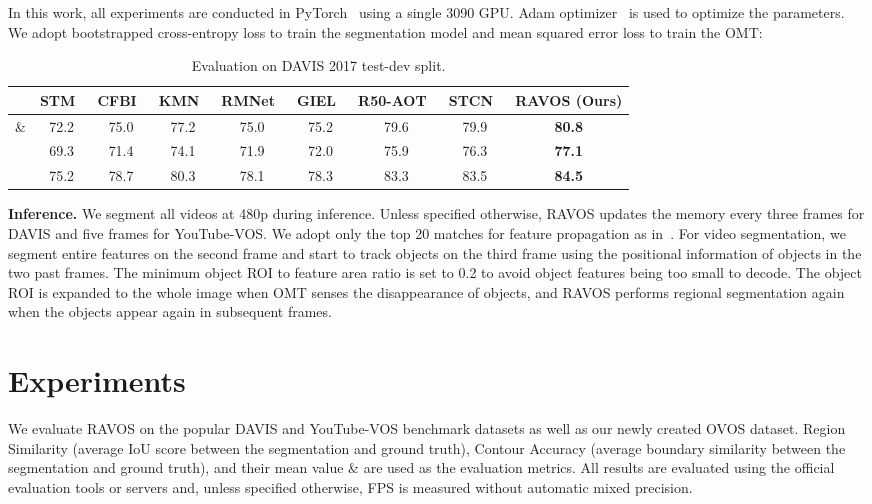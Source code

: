 \documentclass[journal]{IEEEtran}
\begin{document}
In this work, all experiments are conducted in PyTorch~\cite{PyTorch} using a single 3090 GPU. Adam optimizer~\cite{Adam} is used to optimize the parameters. We adopt  bootstrapped cross-entropy loss  to train the segmentation model and mean squared error loss  to train the OMT:




\begin{table*}[h]
\centering
\caption{Evaluation on DAVIS 2017 test-dev split.} \label{tab:davis17test}
\begin{tabular}{ccccccccc}
\toprule 
& STM~\cite{STM} & CFBI~\cite{CFBI} & KMN~\cite{KMN} & RMNet~\cite{RMNet} & GIEL~\cite{GIEL} & R50-AOT~\cite{AOT} & STCN~\cite{STCN} & \textbf{RAVOS (Ours)}  \\
\midrule
\& & 72.2 & 75.0 & 77.2 & 75.0  & 75.2 & 79.6 & 79.9 & \textbf{80.8}   \\
 & 69.3 & 71.4 & 74.1 & 71.9 & 72.0  & 75.9 & 76.3 & \textbf{77.1}  \\
 & 75.2 & 78.7 & 80.3 & 78.1 & 78.3 & 83.3 & 83.5 & \textbf{84.5}    \\
\bottomrule 
\end{tabular}
\end{table*}

\textbf{Inference.} We segment all videos at 480p during inference. Unless specified otherwise, RAVOS updates the memory every three frames for DAVIS and five frames for YouTube-VOS. We adopt only the top 20 matches for feature propagation as in~\cite{STCN}. For video segmentation, we segment entire features on the second frame and start to track objects on the third frame using the positional information of objects in the two past frames. The minimum object ROI to feature area ratio is set to 0.2 to avoid object features being too small to decode. The object ROI is expanded to the whole image when OMT senses the disappearance of objects, and RAVOS performs regional segmentation again when the objects appear again in subsequent frames. 




 


\section{Experiments}

We evaluate RAVOS on the popular DAVIS and YouTube-VOS benchmark datasets as well as our newly created OVOS dataset. Region Similarity  (average IoU score between the segmentation and ground truth), Contour Accuracy  (average boundary similarity between the segmentation and ground truth), and their mean value \& are used as the evaluation metrics. All results are evaluated using the official evaluation tools or servers and, unless specified otherwise, FPS is measured without automatic mixed precision. 
\end{document}
